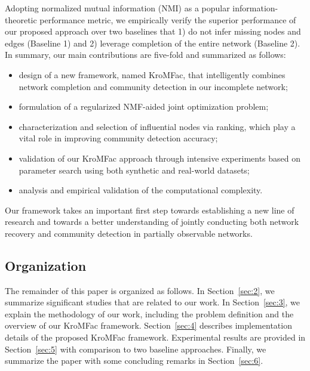 \documentclass[format=acmsmall, review=false, screen=true]{acmart}
\begin{document}
Adopting normalized mutual information (NMI) as a popular information-theoretic performance metric, we empirically verify the superior performance of our proposed approach over two baselines that 1) do not infer missing nodes and edges (Baseline 1) and 2) leverage completion of the entire network (Baseline 2). In summary, our main contributions are five-fold and summarized as follows:
\begin{itemize}
\item design of a new framework, named \textsf{KroMFac}, that intelligently combines network completion and community detection in our incomplete network; 
\item formulation of a regularized NMF-aided joint optimization problem; 
\item characterization and selection of influential nodes via ranking, which play a vital role in improving community detection accuracy; 
\item validation of our \textsf{KroMFac} approach through intensive experiments based on parameter search using both synthetic and real-world datasets;
\item analysis and empirical validation of the computational complexity.
\end{itemize}

Our framework takes an important first step towards establishing a new line of research and towards a better understanding of jointly conducting both network recovery and community detection in partially observable networks.
\subsection{Organization}
The remainder of this paper is organized as follows. In Section~\ref{sec:2}, we summarize significant studies that are related to our work. In Section~\ref{sec:3}, we explain the methodology of our work, including the problem definition and the overview of our \textsf{KroMFac} framework. Section~\ref{sec:4} describes implementation details of the proposed \textsf{KroMFac} framework. Experimental results are provided in Section~\ref{sec:5} with comparison to two baseline approaches. Finally, we summarize the paper with some concluding remarks in Section~\ref{sec:6}.
\end{document}
